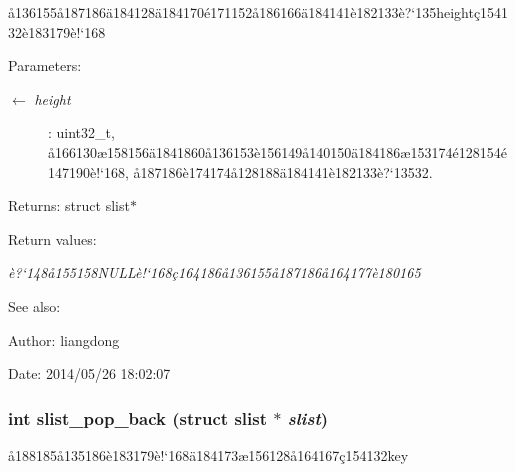 \aa{}136155\aa{}187186\"{a}184128\"{a}184170\'{e}171152\aa{}186166\"{a}184141\`{e}182133\`{e}?`135height\c{c}154132\`{e}183179\`{e}!`168 

\begin{Desc}
\item[Parameters:]
\begin{description}
\item[\mbox{$\leftarrow$} {\em height}]: uint32\_\-t, \aa{}166130\ae{}158156\"{a}1841860\aa{}136153\`{e}156149\aa{}140150\"{a}184186\ae{}153174\'{e}128154\'{e}147190\`{e}!`168, \aa{}187186\`{e}174174\aa{}128188\"{a}184141\`{e}182133\`{e}?`13532. \end{description}
\end{Desc}
\begin{Desc}
\item[Returns:]struct slist$\ast$ \end{Desc}
\begin{Desc}
\item[Return values:]
\begin{description}
\item[{\em \`{e}?`148\aa{}155158NULL\`{e}!`168\c{c}164186\aa{}136155\aa{}187186\aa{}164177\`{e}180165}]\end{description}
\end{Desc}
\begin{Desc}
\item[See also:]\end{Desc}
\begin{Desc}
\item[Author:]liangdong \end{Desc}
\begin{Desc}
\item[Date:]2014/05/26 18:02:07 \end{Desc}
\subsubsection{\setlength{\rightskip}{0pt plus 5cm}int slist\_\-pop\_\-back (struct slist $\ast$ {\em slist})}\label{slist_8c_a15}


\aa{}188185\aa{}135186\`{e}183179\`{e}!`168\"{a}184173\ae{}156128\aa{}164167\c{c}154132key 

